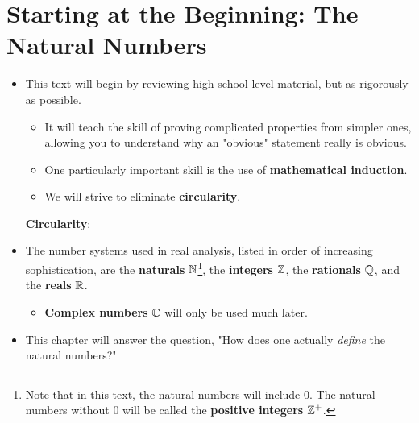 \documentclass[../main.tex]{subfiles}
\begin{document}
\chapter{Starting at the Beginning: The Natural Numbers}
\begin{itemize}
    \item {}This text will begin by reviewing high school level material, but as rigorously as possible.
    \begin{itemize}
        \item It will teach the skill of proving complicated properties from simpler ones, allowing you to understand why an "obvious" statement really is obvious.
        \item One particularly important skill is the use of \textbf{mathematical induction}.
        \item We will strive to eliminate \textbf{circularity}.
    \end{itemize}
    \textbf{Circularity}: 
    \item The number systems used in real analysis, listed in order of increasing sophistication, are the \textbf{naturals} $\mathbb{N}$\footnote{Note that in this text, the natural numbers will include 0. The natural numbers without 0 will be called the \textbf{positive integers} $\mathbb{Z}^+$.}, the \textbf{integers} $\mathbb{Z}$, the \textbf{rationals} $\mathbb{Q}$, and the \textbf{reals} $\mathbb{R}$.
    \begin{itemize}
        \item \textbf{Complex numbers} $\mathbb{C}$ will only be used much later.
    \end{itemize}
    \item This chapter will answer the question, "How does one actually \emph{define} the natural numbers?"
\end{itemize}
\end{document}
